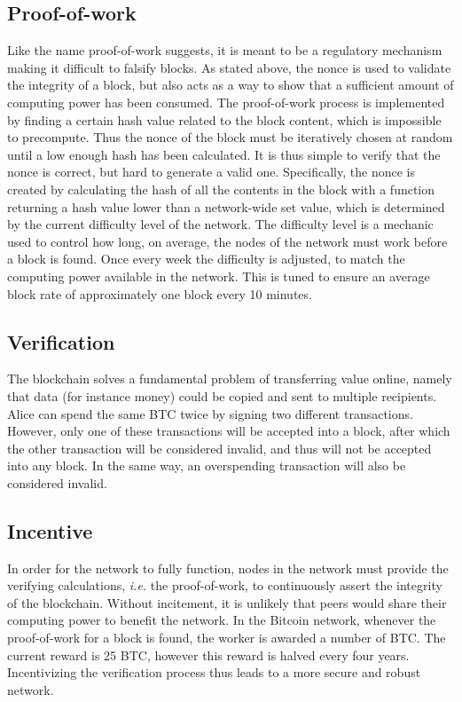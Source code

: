 \subsection{Proof-of-work}
Like the name proof-of-work suggests, it is meant to be a regulatory mechanism making it difficult to falsify blocks. As stated above, the nonce is used to validate the integrity of a block, but also acts as a way to show that a sufficient amount of computing power has been consumed. The proof-of-work process is implemented by finding a certain hash value related to the block content, which is impossible to precompute. Thus the nonce of the block must be iteratively chosen at random until a low enough hash has been calculated. It is thus simple to verify that the nonce is correct, but hard to generate a valid one. Specifically, the nonce is created by calculating the hash of all the contents in the block with a function returning a hash value lower than a network-wide set value, which is determined by the current difficulty level of the network. The difficulty level is a mechanic used to control how long, on average, the nodes of the network must work before a block is found. Once every week the difficulty is adjusted, to match the computing power available in the network. This is tuned to ensure an average block rate of approximately one block every 10 minutes. 

\subsection{Verification}
The blockchain solves a fundamental problem of transferring value online, namely that data (for instance money) could be copied and sent to multiple recipients. Alice can spend the same BTC twice by signing two different transactions. However, only one of these transactions will be accepted into a block, after which the other transaction will be considered invalid, and thus will not be accepted into any block. In the same way, an overspending transaction will also be considered invalid.

\subsection{Incentive}
In order for the network to fully function, nodes in the network must provide the verifying calculations, \textit{i.e.} the proof-of-work, to continuously assert the integrity of the blockchain. Without incitement, it is unlikely that peers would share their computing power to benefit the network. In the Bitcoin network, whenever the proof-of-work for a block is found, the worker is awarded a number of BTC. The current reward is 25 BTC, however this reward is halved every four years. Incentivizing the verification process thus leads to a more secure and robust network.

